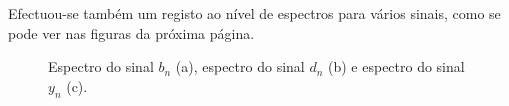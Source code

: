 \documentclass[11pt]{article}
\numberwithin{equation}{section}
\begin{document}
Efectuou-se também um registo ao nível de espectros para vários sinais, como se pode ver nas figuras da próxima página.

\begin{figure}[H]
	\centering
	\hspace{8mm}
	\linebreak
	\vspace{-0.8em}
	\caption{Espectro do sinal $b_n$ (a), espectro do sinal $d_n$ (b) e espectro do sinal $y_n$ (c).}
	\vspace{-0.8em}
\end{figure}
\end{document}
